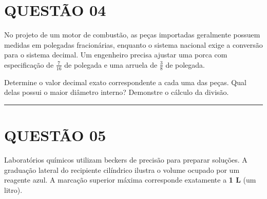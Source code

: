 \documentclass[12pt, a4paper]{article}
\begin{document}
\section*{QUESTÃO 04}

No projeto de um motor de combustão, as peças importadas geralmente possuem medidas em polegadas fracionárias, enquanto o sistema nacional exige a conversão para o sistema decimal. Um engenheiro precisa ajustar uma porca com especificação de  $ \frac{7}{16} $  de polegada e uma arruela de  $ \frac{3}{8} $  de polegada.

Determine o valor decimal exato correspondente a cada uma das peças. Qual delas possui o maior diâmetro interno? Demonstre o cálculo da divisão.

\vspace{0.5cm} \noindent\rule{\textwidth}{0.4pt} \vspace{0.5cm}

\section*{QUESTÃO 05}

Laboratórios químicos utilizam beckers de precisão para preparar soluções. A graduação lateral do recipiente cilíndrico ilustra o volume ocupado por um reagente azul. A marcação superior máxima corresponde exatamente a \textbf{1 L} (um litro).

\begin{center}
\end{center}
\end{document}
